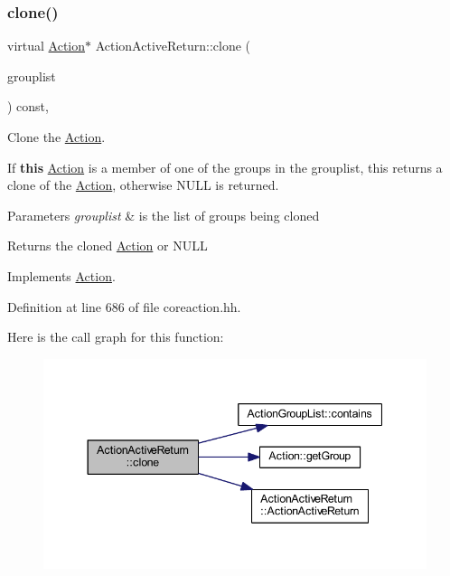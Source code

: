 \subsubsection{\texorpdfstring{clone()}{clone()}}
{\footnotesize\ttfamily virtual \mbox{\hyperlink{class_action}{Action}}$\ast$ Action\+Active\+Return\+::clone (\begin{DoxyParamCaption}\item[{const \mbox{\hyperlink{class_action_group_list}{Action\+Group\+List}} \&}]{grouplist }\end{DoxyParamCaption}) const\hspace{0.3cm}{\ttfamily [inline]}, {\ttfamily [virtual]}}



Clone the \mbox{\hyperlink{class_action}{Action}}. 

If {\bfseries{this}} \mbox{\hyperlink{class_action}{Action}} is a member of one of the groups in the grouplist, this returns a clone of the \mbox{\hyperlink{class_action}{Action}}, otherwise N\+U\+LL is returned. 
\begin{DoxyParams}{Parameters}
{\em grouplist} & is the list of groups being cloned \\
\hline
\end{DoxyParams}
\begin{DoxyReturn}{Returns}
the cloned \mbox{\hyperlink{class_action}{Action}} or N\+U\+LL 
\end{DoxyReturn}


Implements \mbox{\hyperlink{class_action_af8242e41d09e5df52f97df9e65cc626f}{Action}}.



Definition at line 686 of file coreaction.\+hh.

Here is the call graph for this function\+:
\nopagebreak
\begin{figure}[H]
\begin{center}
\leavevmode
\includegraphics[width=344pt]{class_action_active_return_af22b0befcda10abe00618917a557f6c2_cgraph}
\end{center}
\end{figure}


